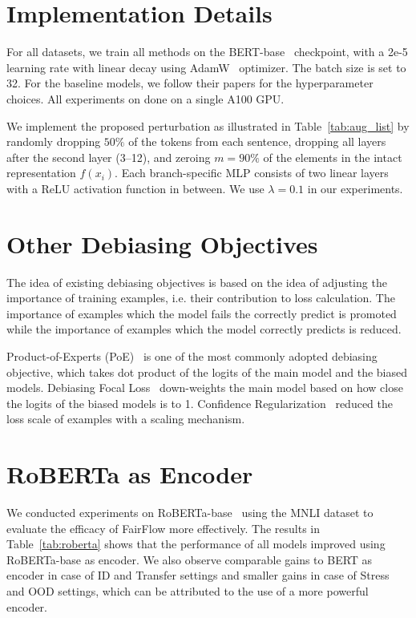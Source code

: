 \section{Implementation Details}
For all datasets, we train all methods on the BERT-base~\citep{devlin-etal-2019-bert} checkpoint, with a 2e-5 learning rate with linear decay using AdamW~\citep{kingma2014adam} optimizer. The batch size is set to 32. For the baseline models, we follow their papers for the hyperparameter choices. All experiments on done on a single A100 GPU.


We implement the proposed perturbation as illustrated in Table~\ref{tab:aug_list} by randomly dropping $50\%$ of the tokens from each sentence, dropping all layers after the second layer (3--12), %
and zeroing $m=90\%$ of the elements in the intact representation $f(x_i)$. Each branch-specific MLP consists of two linear layers with a ReLU activation function in between. 
We use $\lambda = 0.1$ in our experiments.


\section{Other Debiasing Objectives}
\label{sec:debias_obj}
The idea of existing debiasing objectives is based on the idea of adjusting the importance of training examples, i.e. their contribution to loss calculation. The importance of examples which the model fails the correctly predict is promoted while the importance of examples which the model correctly predicts is reduced. 

Product-of-Experts (PoE)~\citep{clark-etal-2019-dont,karimi-mahabadi-etal-2020-end,sanh2020learning} is one of the most commonly adopted debiasing objective, which takes dot product of the logits of the main model and the biased models. Debiasing Focal Loss~\citep{karimi-mahabadi-etal-2020-end} down-weights the main model based on how close the logits of the biased models is to 1. Confidence Regularization~\citep{utama-etal-2020-towards} reduced the loss scale of examples with a scaling mechanism.

\section{RoBERTa as Encoder}
We conducted experiments on RoBERTa-base~\citep{liu2019roberta} using the MNLI dataset to evaluate the efficacy of FairFlow more effectively. The results in Table~\ref{tab:roberta} shows that the performance of all models improved using RoBERTa-base as encoder. We also observe comparable gains to BERT as encoder in case of ID and Transfer settings and smaller gains in case of Stress and OOD settings, which can be attributed to the use of a more powerful encoder.


